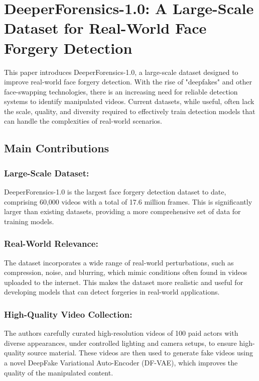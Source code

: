 \documentclass{report}
\begin{document}
	
	
	
	
	
	
	
	
	\chapter{DeeperForensics-1.0: A Large-Scale Dataset for Real-World Face Forgery Detection \cite{jiang2020deeperforensics10largescaledatasetrealworld}}
	
	This paper introduces DeeperForensics-1.0, a large-scale dataset designed to improve real-world face forgery detection. With the rise of "deepfakes" and other face-swapping technologies, there is an increasing need for reliable detection systems to identify manipulated videos. Current datasets, while useful, often lack the scale, quality, and diversity required to effectively train detection models that can handle the complexities of real-world scenarios.
	
	\section{Main Contributions}
	\subsection{Large-Scale Dataset:}
	DeeperForensics-1.0 is the largest face forgery detection dataset to date, comprising 60,000 videos with a total of 17.6 million frames. This is significantly larger than existing datasets, providing a more comprehensive set of data for training models.
	
	\subsection{Real-World Relevance:}
	The dataset incorporates a wide range of real-world perturbations, such as compression, noise, and blurring, which mimic conditions often found in videos uploaded to the internet. This makes the dataset more realistic and useful for developing models that can detect forgeries in real-world applications.
	
	\subsection{High-Quality Video Collection:}
	The authors carefully curated high-resolution videos of 100 paid actors with diverse appearances, under controlled lighting and camera setups, to ensure high-quality source material. These videos are then used to generate fake videos using a novel DeepFake Variational Auto-Encoder (DF-VAE), which improves the quality of the manipulated content.
	
\end{document}
